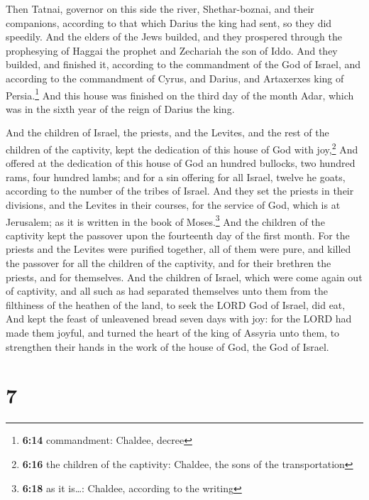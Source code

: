  Then Tatnai, governor on this side the river,
Shethar-boznai, and their companions, according to that which Darius the
king had sent, so they did speedily.  And the elders of
the Jews builded, and they prospered through the prophesying of Haggai
the prophet and Zechariah the son of Iddo. And they builded, and
finished it, according to the commandment of the God of Israel, and
according to the commandment of Cyrus, and Darius, and Artaxerxes king
of Persia.\footnote{\textbf{6:14} commandment: Chaldee, decree}
 And this house was finished on the third day of the
month Adar, which was in the sixth year of the reign of Darius the king.

 And the children of Israel, the priests, and the
Levites, and the rest of the children of the captivity, kept the
dedication of this house of God with joy,\footnote{\textbf{6:16} the
  children of the captivity: Chaldee, the sons of the transportation}
 And offered at the dedication of this house of God an
hundred bullocks, two hundred rams, four hundred lambs; and for a sin
offering for all Israel, twelve he goats, according to the number of the
tribes of Israel.  And they set the priests in their
divisions, and the Levites in their courses, for the service of God,
which is at Jerusalem; as it is written in the book of Moses.\footnote{\textbf{6:18}
  as it is\ldots: Chaldee, according to the writing}  And
the children of the captivity kept the passover upon the fourteenth day
of the first month.  For the priests and the Levites were
purified together, all of them were pure, and killed the passover for
all the children of the captivity, and for their brethren the priests,
and for themselves.  And the children of Israel, which
were come again out of captivity, and all such as had separated
themselves unto them from the filthiness of the heathen of the land, to
seek the LORD God of Israel, did eat,  And kept the feast
of unleavened bread seven days with joy: for the LORD had made them
joyful, and turned the heart of the king of Assyria unto them, to
strengthen their hands in the work of the house of God, the God of
Israel.

\hypertarget{section-6}{%
\section{7}\label{section-6}}

